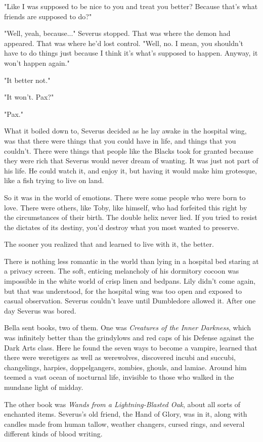 \documentclass[a4paper,11pt]{article}
\begin{document}
"Like I was supposed to be nice to you and treat you better? Because that's what friends are supposed to do?"

"Well, yeah, because..." Severus stopped. That was where the demon had appeared. That was where he'd lost control. "Well, no. I mean, you shouldn't have to do things just because I think it's what's supposed to happen. Anyway, it won't happen again."

"It better not."

"It won't. Pax?"

"Pax."

What it boiled down to, Severus decided as he lay awake in the hospital wing, was that there were things that you could have in life, and things that you couldn't. There were things that people like the Blacks took for granted because they were rich that Severus would never dream of wanting. It was just not part of his life. He could watch it, and enjoy it, but having it would make him grotesque, like a fish trying to live on land.

So it was in the world of emotions. There were some people who were born to love. There were others, like Toby, like himself, who had forfeited this right by the circumstances of their birth. The double helix never lied. If you tried to resist the dictates of its destiny, you'd destroy what you most wanted to preserve.

The sooner you realized that and learned to live with it, the better.

There is nothing less romantic in the world than lying in a hospital bed staring at a privacy screen. The soft, enticing melancholy of his dormitory cocoon was impossible in the white world of crisp linen and bedpans. Lily didn't come again, but that was understood, for the hospital wing was too open and exposed to casual observation. Severus couldn't leave until Dumbledore allowed it. After one day Severus was bored.

Bella sent books, two of them. One was \emph{Creatures of the Inner Darkness}, which was infinitely better than the grindylows and red caps of his Defense against the Dark Arts class. Here he found the seven ways to become a vampire, learned that there were weretigers as well as werewolves, discovered incubi and succubi, changelings, harpies, doppelgangers, zombies, ghouls, and lamiae. Around him teemed a vast ocean of nocturnal life, invisible to those who walked in the mundane light of midday.

The other book was \emph{Wands from a Lightning-Blasted Oak}, about all sorts of enchanted items. Severus's old friend, the Hand of Glory, was in it, along with candles made from human tallow, weather changers, cursed rings, and several different kinds of blood writing.
\end{document}
